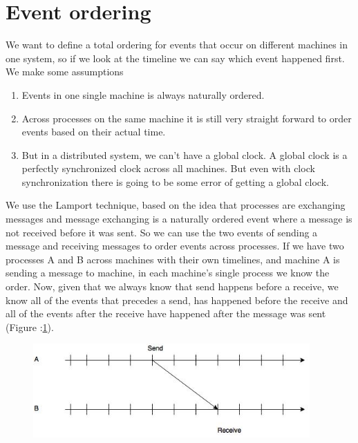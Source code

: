 \documentclass[twoside]{article}
\begin{document}
\section{Event ordering}
We want to define a total ordering for events that occur on different machines in one system, so if we look at the timeline we can say which event happened first. We make some assumptions
\begin{enumerate}
    \item Events in one single machine is always naturally ordered.
    \item Across processes on the same machine it is still very straight forward to order events based on their actual time.
    \item But in a distributed system, we can't have a global clock. A global clock is a perfectly synchronized clock across all machines. But even with clock synchronization there is going to be some error of getting a global clock.
\end{enumerate}
We use the Lamport technique, based on the idea that processes are exchanging messages and message exchanging is a naturally ordered event where a message is not received before it was sent.\newline
So we can use the two events of sending a message and receiving messages to order events across processes.\newline
If we have two processes A and B across machines with their own timelines, and machine A is sending a message to machine, in each machine's single process we know the order. Now, given that we always know that send happens before a receive, we know all of the events that precedes a send, has happened before the receive and all of the events after the receive have happened after the message was sent (Figure :\ref{fig:figure_of_send_receive}).\newline
\begin{figure}[h]
\centering
\includegraphics[width=400]{diagram1.jpg}
\label{fig:figure_of_send_receive}
\caption{}
\end{figure}
\end{document}
